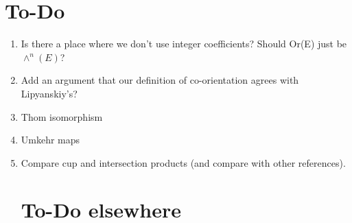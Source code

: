 

\section*{To-Do}
\begin{enumerate}




	\item Is there a place where we don't use integer coefficients?  Should Or(E) just be $\wedge^n(E)$?

\item Add an argument that our definition of co-orientation agrees with Lipyanskiy's?

\item Thom isomorphism

\item Umkehr maps

\item Compare cup and intersection products (and compare with other references).


\begin{comment}
	\item \sout{Picture for creasing.}
	\item Compactness and orientation assumptions on Theorem 3.13 (transversality constrains preserve q-iso type).

	\item \sout{Treatment of creasing.}
	\item Guillemin-Pollock for mnfds with corner.

	\item Clarify isomorphisms used in orientations and make more explicit how the Lipyanskiy orientations fit.


	\item More on Mayer-Vietoris - check full argument
	\item Poincar\'e Lemma - check new proof
	\item (Anibal) Add a better treatment of ``cst" from \verb|Flows/old/pd_cubical_S2.Feb16.tex| \\
	Greg: Let K be any finite set of cubical faces and let L be a single cubical face. We need $cst(K)\cup cst(L)$ to be $cst(K\cup L)$  (maybe this part is just by definition?) and we need $cst(K)\cap cst(L)$ to be $cst(K ? L)$   where $K ? L$ needs to be some set of faces with cardinality less than or equal to that of K.
\end{comment}

\begin{comment}
\item Reference for pullback of normal bundle is normal bundle of pullback
\item Reference for pullback of tangent spaces is tangent space of pullbacks (argument already given?)
\end{comment}


\section*{To-Do elsewhere}



\end{enumerate}

